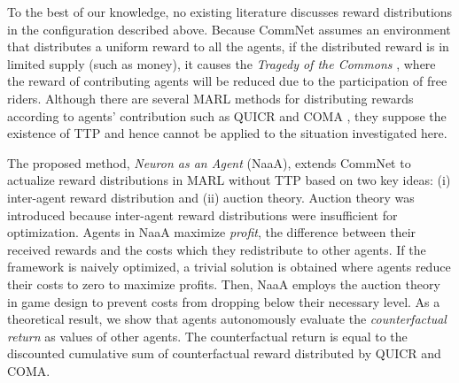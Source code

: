 To the best of our knowledge, no existing literature discusses reward distributions in the configuration described above.
Because CommNet assumes an environment that distributes a uniform reward to all the agents, 
if the distributed reward is in limited supply (such as money), it causes the {\em Tragedy of the Commons} \citep{lloyd1833two}, where the reward of contributing agents will be reduced due to the participation of free riders.
Although there are several MARL methods for distributing rewards according to agents' contribution such as QUICR \citep{agogino2006quicr} and COMA \citep{sukhbaatar2016learning}, they suppose the existence of TTP and hence cannot be applied to the situation investigated here.


The proposed method, {\em Neuron as an Agent} (NaaA), extends CommNet to actualize reward distributions
in MARL without TTP based on two key ideas: (i) inter-agent reward distribution and (ii) auction theory.
Auction theory was introduced because inter-agent reward distributions were insufficient for optimization.
Agents in NaaA maximize {\em profit}, the difference between their received rewards and the costs which they redistribute to other agents.
If the framework is naively optimized, a trivial solution is obtained where agents reduce their costs to zero to maximize profits.
Then, NaaA employs the auction theory in game design to prevent costs from dropping below their necessary level.
As a theoretical result, we show that agents autonomously evaluate the {\em counterfactual return} as values of other agents.
The counterfactual return is equal to the discounted cumulative sum of counterfactual reward \citep{agogino2006quicr} distributed by QUICR and COMA.

